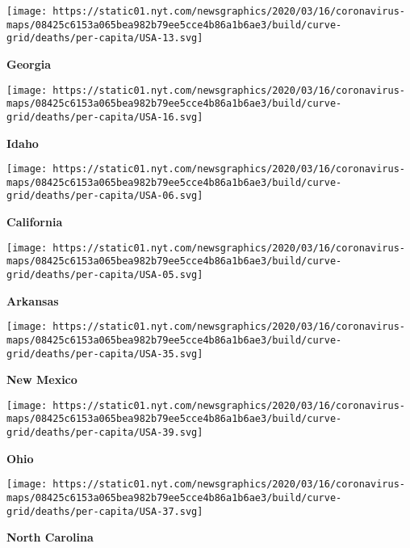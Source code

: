 \texttt{[image: https://static01.nyt.com/newsgraphics/2020/03/16/coronavirus-maps/08425c6153a065bea982b79ee5cce4b86a1b6ae3/build/curve-grid/deaths/per-capita/USA-13.svg]}

\textbf{Georgia}

\href{https://www.nytimes.com/interactive/2020/us/idaho-coronavirus-cases.html}{}

\texttt{[image: https://static01.nyt.com/newsgraphics/2020/03/16/coronavirus-maps/08425c6153a065bea982b79ee5cce4b86a1b6ae3/build/curve-grid/deaths/per-capita/USA-16.svg]}

\textbf{Idaho}

\href{https://www.nytimes.com/interactive/2020/us/california-coronavirus-cases.html}{}

\texttt{[image: https://static01.nyt.com/newsgraphics/2020/03/16/coronavirus-maps/08425c6153a065bea982b79ee5cce4b86a1b6ae3/build/curve-grid/deaths/per-capita/USA-06.svg]}

\textbf{California}

\href{https://www.nytimes.com/interactive/2020/us/arkansas-coronavirus-cases.html}{}

\texttt{[image: https://static01.nyt.com/newsgraphics/2020/03/16/coronavirus-maps/08425c6153a065bea982b79ee5cce4b86a1b6ae3/build/curve-grid/deaths/per-capita/USA-05.svg]}

\textbf{Arkansas}

\href{https://www.nytimes.com/interactive/2020/us/new-mexico-coronavirus-cases.html}{}

\texttt{[image: https://static01.nyt.com/newsgraphics/2020/03/16/coronavirus-maps/08425c6153a065bea982b79ee5cce4b86a1b6ae3/build/curve-grid/deaths/per-capita/USA-35.svg]}

\textbf{New Mexico}

\href{https://www.nytimes.com/interactive/2020/us/ohio-coronavirus-cases.html}{}

\texttt{[image: https://static01.nyt.com/newsgraphics/2020/03/16/coronavirus-maps/08425c6153a065bea982b79ee5cce4b86a1b6ae3/build/curve-grid/deaths/per-capita/USA-39.svg]}

\textbf{Ohio}

\href{https://www.nytimes.com/interactive/2020/us/north-carolina-coronavirus-cases.html}{}

\texttt{[image: https://static01.nyt.com/newsgraphics/2020/03/16/coronavirus-maps/08425c6153a065bea982b79ee5cce4b86a1b6ae3/build/curve-grid/deaths/per-capita/USA-37.svg]}

\textbf{North Carolina}

